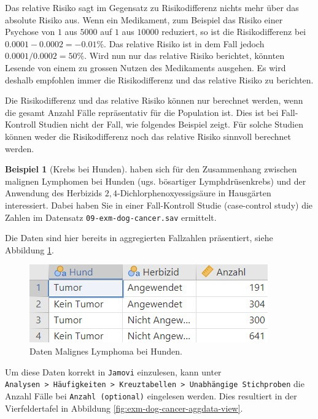 \documentclass[
]{book}
\theoremstyle{definition}
\theoremstyle{definition}
\newtheorem{example}{Beispiel}[chapter]
\theoremstyle{definition}
\theoremstyle{definition}
\theoremstyle{remark}
\begin{document}
Das relative Risiko sagt im Gegensatz zu Risikodifferenz nichts mehr
über das absolute Risiko aus. Wenn ein Medikament, zum Beispiel das
Risiko einer Psychose von \(1\) aus \(5000\) auf \(1\) aus \(10000\) reduziert,
so ist die Risikodifferenz bei \(0.0001 - 0.0002 = -0.01\%\). Das relative
Risiko ist in dem Fall jedoch \(0.0001/0.0002 = 50\%\). Wird nun nur das
relative Risiko berichtet, könnten Lesende von einem zu grossen Nutzen
des Medikaments ausgehen. Es wird deshalb empfohlen immer die
Risikodifferenz und das relative Risiko zu berichten.

Die Risikodifferenz und das relative Risiko können nur berechnet werden,
wenn die gesamt Anzahl Fälle repräsentativ für die Population ist. Dies
ist bei Fall-Kontroll Studien nicht der Fall, wie folgendes Beispiel
zeigt. Für solche Studien können weder die Risikodifferenz noch das
relative Risiko sinnvoll berechnet werden.

\begin{example}[Krebs bei Hunden]
\protect\hypertarget{exm:dog-cancer}{}\label{exm:dog-cancer}\citet{hayes1991} haben sich für den Zusammenhang zwischen malignen Lymphomen
bei Hunden (ugs. bösartiger Lymphdrüsenkrebs) und der Anwendung des
Herbizids \(2, 4\)-Dichlorphenoxyessigsäure in Hausgärten interessiert.
Dabei haben Sie in einer Fall-Kontroll Studie (case-control study) die
Zahlen im Datensatz \texttt{09-exm-dog-cancer.sav} ermittelt.
\end{example}

Die Daten sind hier bereits in aggregierten Fallzahlen präsentiert,
siehe Abbildung \ref{fig:exm-dog-cancer-data-view}.

\begin{figure}

{\centering \includegraphics[width=0.5\linewidth]{figures/09-exm-dog-cancer-data-view} 

}

\caption{Daten Malignes Lymphoma bei Hunden.}\label{fig:exm-dog-cancer-data-view}
\end{figure}

Um diese Daten korrekt in \texttt{Jamovi} einzulesen, kann unter
\texttt{Analysen\ \textgreater{}\ Häufigkeiten\ \textgreater{}\ Kreuztabellen\ \textgreater{}\ Unabhängige\ Stichproben} die
Anzahl Fälle bei \texttt{Anzahl\ (optional)} eingelesen werden. Dies resultiert
in der Vierfeldertafel in Abbildung
\ref{fig:exm-dog-cancer-aggdata-view}.
\end{document}
